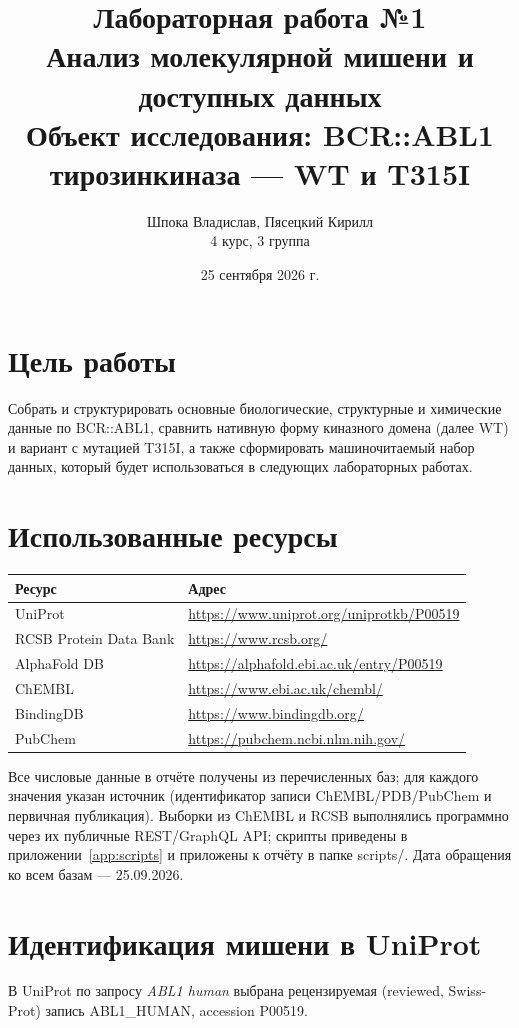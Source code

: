\documentclass[12pt,a4paper]{article}
\title{\textbf{Лабораторная работа №1}\\[4pt]
Анализ молекулярной мишени и доступных данных\\[4pt]
\large Объект исследования: BCR::ABL1 тирозинкиназа --- WT и T315I}
\author{Шпока Владислав, Пясецкий Кирилл\\4 курс, 3 группа}
\date{25 сентября 2026 г.}
\newcommand{\code}[1]{{\ttfamily #1}}
\begin{document}
\maketitle

\section*{Цель работы}
Собрать и структурировать основные биологические, структурные и химические данные
по BCR::ABL1, сравнить нативную форму киназного домена (далее WT) и вариант с мутацией
T315I, а также сформировать машиночитаемый набор данных, который будет использоваться
в следующих лабораторных работах.

\section*{Использованные ресурсы}
\begin{center}
\begin{tabular}{L{5cm}L{9.5cm}}
\toprule
\textbf{Ресурс} & \textbf{Адрес} \\
\midrule
UniProt & \url{https://www.uniprot.org/uniprotkb/P00519} \\
RCSB Protein Data Bank & \url{https://www.rcsb.org/} \\
AlphaFold DB & \url{https://alphafold.ebi.ac.uk/entry/P00519} \\
ChEMBL & \url{https://www.ebi.ac.uk/chembl/} \\
BindingDB & \url{https://www.bindingdb.org/} \\
PubChem & \url{https://pubchem.ncbi.nlm.nih.gov/} \\
\bottomrule
\end{tabular}
\end{center}

\bigskip
Все числовые данные в отчёте получены из перечисленных баз; для каждого значения
указан источник (идентификатор записи ChEMBL/PDB/PubChem и первичная публикация).
Выборки из ChEMBL и RCSB выполнялись программно через их публичные REST/GraphQL API;
скрипты приведены в приложении~\ref{app:scripts} и приложены к отчёту в папке
\code{scripts/}. Дата обращения ко всем базам --- 25.09.2026.

\section{Идентификация мишени в UniProt}

В UniProt по запросу \emph{ABL1 human} выбрана рецензируемая (reviewed, Swiss-Prot)
запись \code{ABL1\_HUMAN}, accession \code{P00519}.
\end{document}
